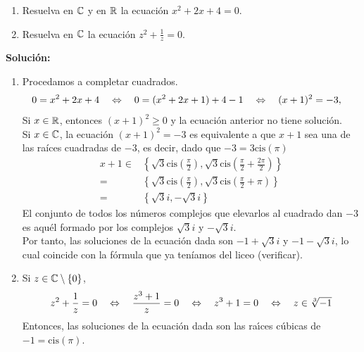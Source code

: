 \begin{ejercicio}{}{}
    \begin{enumerate}
        \item Resuelva en $\mathbb{C}$ y en $\mathbb{R}$ la ecuaci\'on $x^2 + 2x + 4 = 0$.
        \item Resuelva en $\mathbb{C}$ la ecuaci\'on 
        $\displaystyle z^2 + \frac 1 z = 0$.
    \end{enumerate}
    \vspace{0.3cm}
    \textbf{Soluci\'on:}
    \begin{enumerate}
        \item 
            Procedamos a completar cuadrados.
            \begin{align*}
                0 = x^2 + 2 x + 4\quad & \Leftrightarrow \quad 0 = (x^2 + 2 x + 1) + 4 - 1
                \quad \Leftrightarrow \quad (x+1)^2 = - 3,
            \end{align*}
            Si $x \in \mathbb{R}$, entonces $(x+1)^2 \ge 0$ y 
            la ecuaci\'on anterior
            no tiene soluci\'on.\\
            
            Si $x \in \mathbb{C}$, la ecuaci\'on $(x+1)^2 = - 3$ 
            es equivalente a que 
            $x+1$ sea una de las ra\'ices cuadradas de $- 3$, es decir, dado que $- 3=3\mbox{cis}(\pi)$
            \begin{align*}
                x+1 \in &\left\{ \sqrt{3}\mbox{cis}\left(\frac{\pi}{2}\right),\sqrt{3}\mbox{cis}\left(\frac{\pi}{2}+\frac{2\pi}{2}\right)\right\}\\
                =&\left\{ \sqrt{3}\mbox{cis}\left(\frac{\pi}{2}\right),\sqrt{3}\mbox{cis}\left(\frac{\pi}{2}+\pi\right)\right\}\\
                =&\left\{ \sqrt{3}i,-\sqrt{3}i\right\}
            \end{align*}
            El conjunto de todos
            los n\'umeros complejos que elevarlos al cuadrado dan
            $- 3$ es aqu\'el formado por los complejos 
            $\sqrt{3} i$ y $-\sqrt{3} i$.\\
            
            Por tanto, las soluciones de la ecuaci\'on dada son	
            $- 1 + \sqrt{3} i$ y $- 1 - \sqrt{3} i$, lo cual coincide con la fórmula que ya teníamos del liceo (verificar).
            
        \item Si $z \in \mathbb{C} \setminus \{0\}$,
            \begin{align*}
                z^2 + \frac 1 z = 0 \quad \Leftrightarrow \quad \frac{z^3 + 1}{z} = 0 \quad \Leftrightarrow \quad z^3 + 1 = 0 \quad \Leftrightarrow \quad z 
                \in \sqrt[3]{- 1}
            \end{align*}
            Entonces, las soluciones de la ecuaci\'on dada son las ra\'{\i}ces c\'ubicas de
            $- 1 = \mbox{cis}(\pi)$.
    \end{enumerate}
\end{ejercicio}


